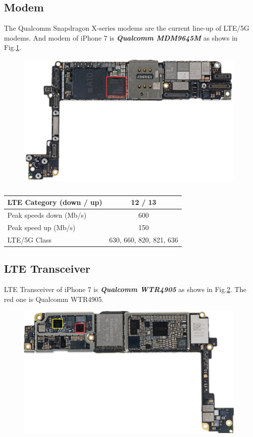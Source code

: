 \documentclass[conference]{IEEEtran}
\begin{document}
\subsection{Modem}
The Qualcomm Snapdragon X-series modems are the current line-up of LTE/5G modems. And modem of iPhone 7 is {\bfseries{\emph{Qualcomm MDM9645M}}} as shows in Fig.\ref{fig:modem}.
\begin{figure}[!ht]
	\centering
	\begin{center}
		\includegraphics*[width=0.8\linewidth]{modem}
		\caption{}
		\label{fig:modem}
	\end{center}
\end{figure}
\begin{table}[htbp]
	\centering
	\caption{}
	\begin{tabular}{l | c}
		\hline \hline
		LTE Category (down / up) & 12 / 13\label{table:modem} \\
		\hline
		Peak speeds down (Mb/s)	&600\\ 
		\hline
		Peak speed up (Mb/s)&150\\
		\hline
		LTE/5G Class&630, 660, 820, 821, 636\\
		\hline \hline 
	\end{tabular}
\end{table}

\subsection{LTE Transceiver}
LTE Transceiver of iPhone 7 is {\bfseries{\emph{Qualcomm WTR4905}}} as shows in Fig.\ref{fig:rf}. The red one is Qualcomm WTR4905.
\begin{figure}[!ht]
	\centering
	\begin{center}
		\includegraphics*[width=0.8\linewidth]{rf}
		\caption{}
		\label{fig:rf}
	\end{center}
\end{figure}
\end{document}
